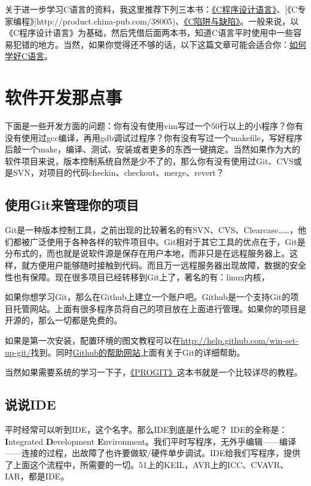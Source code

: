 \documentclass[a4paper]{book}
\newcommand{\chap}[1]{\newpage\thispagestyle{empty}\chapter{#1}\label{chap:\thechapter}}
\begin{document}
关于进一步学习C语言的资料，我这里推荐下列三本书：\href{http://product.china-pub.com/14975\&ref=browse}{《C程序设计语言》}、{[}《C专家编程》{]}http://product.china-pub.com/38005)、\href{http://product.china-pub.com/38125}{《C陷阱与缺陷》}。一般来说，以《C程序设计语言》为基础，然后凭借后面两本书，知道C语言平时使用中一些容易犯错的地方。当然，如果你觉得还不够的话，以下这篇文章可能会适合你：\href{http://coolshell.cn/articles/4102.html}{如何学好C语言}。

\chap{软件开发那点事}

下面是一些开发方面的问题：你有没有使用vim写过一个50行以上的小程序？你有没有使用过gcc编译，再用gdb调试过程序？你有没有写过一个makefile，写好程序后敲一个make，编译、测试、安装或者更多的东西一键搞定。当然如果作为大的软件项目来说，版本控制系统自然是少不了的，那么你有没有使用过Git、CVS或是SVN，对项目的代码checkin、checkout、merge、revert？

\section{使用Git来管理你的项目}

Git是一种版本控制工具，之前出现的比较著名的有SVN、CVS、Clearcase\ldots{}\ldots{}，他们都被广泛使用于各种各样的软件项目中。Git相对于其它工具的优点在于，Git是分布式的，而也就是说软件源是保存在用户本地，而非只是在远程服务器上。这样，就方便用户能够随时接触到代码。而且万一远程服务器出现故障，数据的安全性也有保障。现在很多项目已经转移到Git上了，著名的有：linux内核，

如果你想学习Git，那么在Github上建立一个账户吧。Github是一个支持Git的项目托管网站。上面有很多程序员将自己的项目放在上面进行管理。如果你的项目是开源的，那么一切都是免费的。

如果是第一次安装，配置环境的图文教程可以在\url{http://help.github.com/win-set-up-git/}找到。同时\href{http://help.github.com/}{Github的帮助网站}上面有关于Git的详细帮助。

当然如果需要系统的学习一下子，\href{http://progit.org/}{《PROGIT》}这本书就是一个比较详尽的教程。

\section{说说IDE}

平时经常可以听到IDE，这个名字。那么IDE到底是什么呢？ IDE的全称是： \textbf{I}ntegrated \textbf{D}evelopment \textbf{E}nvironment。我们平时写程序，无外乎编辑------编译------连接的过程，出故障了也许要做软/硬件单步调试。IDE给我们写程序，提供了上面这个流程中，所需要的一切。51上的KEIL，AVR上的ICC、CVAVR、IAR，都是IDE。
\end{document}
